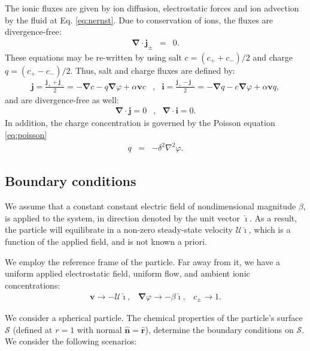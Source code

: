 \documentclass[10pt]{ijnam}
\newcommand\Laplacian{\nabla^2}
\newcommand\bnabla{\boldsymbol{\nabla}}
\newcommand\bv{\boldsymbol{v}}
\newcommand\bn{\boldsymbol{\hat{n}}}
\newcommand\bj{\boldsymbol{j}}
\newcommand\bi{\boldsymbol{i}}
\newcommand\br{\boldsymbol{r}}
\newcommand\brhat{\hat{\br}}
\newcommand\cU{\mathscr{U}}
\newcommand\ui{\boldsymbol{\hat{\imath}}}
\begin{document}
The ionic fluxes are given by ion diffusion, electrostatic forces and ion advection by the fluid
at Eq. \eqref{eq:nernst}. Due to conservation of ions, the fluxes are divergence-free:
\begin{eqnarray*}
\bnabla \cdot \bj_\pm &=& 0.
\end{eqnarray*}
These equations may be re-written by using salt $c = (c_+ + c_-)/2$ and charge $q = (c_+ - c_-)/2$.
Thus, salt and charge fluxes are defined by:
\begin{eqnarray} \label{eq:fluxes}
  \bj = \frac{\bj_+ + \bj_-}{2} = -\bnabla c - q \bnabla \varphi + \alpha \bv c &,& 
  \bi = \frac{\bj_+ - \bj_-}{2} = -\bnabla q - c \bnabla \varphi + \alpha \bv q,
\end{eqnarray}
and are divergence-free as well:
\begin{eqnarray} \label{eq:zero_flux}
\bnabla \cdot \bj = 0 &,& 
\bnabla \cdot \bi = 0. 
\end{eqnarray}
In addition, the charge concentration is governed by the Poisson equation \eqref{eq:poisson}
\begin{eqnarray}
q &=& -\delta^2 \Laplacian \varphi.
\end{eqnarray}

\subsection{Boundary conditions}
We assume that a constant constant electric field of nondimensional magnitude $\beta$,
is applied to the system, in direction denoted by the unit vector $\ui$.
As a result, the particle will equilibrate in 
a non-zero steady-state velocity $\cU \ui$, which is
a function of the applied field, and is not known a priori.

We employ the reference frame of the particle.
Far away from it, we have a uniform applied electrostatic field, uniform flow,
and ambient ionic concentrations:
\begin{eqnarray} \label{eq:bndcond_inf}
\bv \rightarrow -\cU \ui, &
\bnabla \varphi \rightarrow -\beta\ui, &
 c_\pm \rightarrow 1.
\end{eqnarray}

We consider a spherical particle.
The chemical properties of the particle's surface $\mathcal{S}$ (defined at $r=1$ 
with normal $\bn = \brhat$), determine the boundary conditions on $\mathcal{S}$.
We consider the following scenarios:
\end{document}
